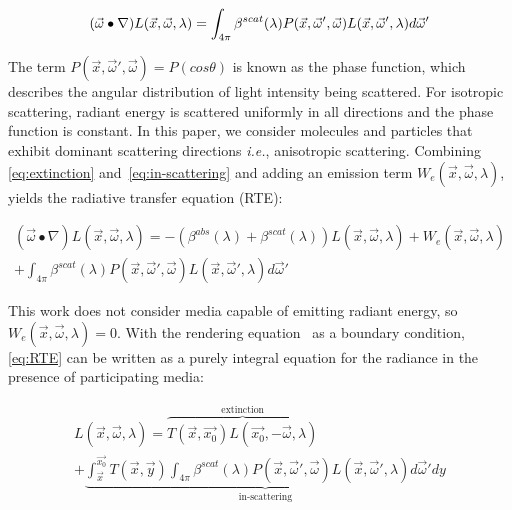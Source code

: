 \documentclass[journal]{vgtc}                %
\begin{document}
\begin{equation}\label{eq:in-scattering}
\small
(\vec{\omega}\bullet \nabla)L(\vec{x},\vec{\omega}, \lambda) = \int_{4\pi}{ \beta^{scat}(\lambda)P(\vec{x}, \vec{\omega}', \vec{\omega})L(\vec{x},\vec{\omega}', \lambda)d\vec{\omega}'}
\end{equation}

The term $P(\vec{x}, \vec{\omega}', \vec{\omega}) = P(cos\theta)$ is known as the phase function, which describes the angular distribution of light intensity being scattered. For isotropic scattering, radiant energy is scattered uniformly in all directions and the phase function is constant. In this paper, we consider molecules and particles that exhibit dominant scattering directions \textit{i.e.}, anisotropic scattering. Combining \autoref{eq:extinction} and~\autoref{eq:in-scattering} and adding an emission term $W_{e}(\vec{x},\vec{\omega}, \lambda)$, yields the radiative transfer equation (RTE):

\vspace*{-4.5mm}
{
  \small
\begin{multline}\label{eq:RTE}
(\vec{\omega}\bullet \nabla)L(\vec{x},\vec{\omega}, \lambda) = - (\beta^{abs}(\lambda) + \beta^{scat}(\lambda))L(\vec{x},\vec{\omega}, \lambda) + W_{e}(\vec{x},\vec{\omega}, \lambda)\\
 + \int_{4\pi}{ \beta^{scat}(\lambda)P(\vec{x}, \vec{\omega}', \vec{\omega})L(\vec{x},\vec{\omega}', \lambda)d\vec{\omega}'}
\end{multline}
}
\vspace*{-4mm}

This work does not consider media capable of emitting radiant energy, so $W_{e}(\vec{x},\vec{\omega}, \lambda) = 0$. With the rendering equation~\cite{Kajiya:1986} as a boundary condition, \autoref{eq:RTE} can be written as a purely integral equation for the radiance in the presence of participating media:

\vspace*{-6mm}
{
  \small
  \begin{multline}\label{eq:VRE}
    L(\vec{x},\vec{\omega}, \lambda) = \overbrace{T(\vec{x}, \vec{x_0})L(\vec{x_0},-\vec{\omega}, \lambda)}^{\text{extinction}}\\
    + \underbrace{\int_{\vec{x}}^{\vec{x_0}}{T(\vec{x}, \vec{y})\int_{4\pi}{ \beta^{scat}(\lambda)P(\vec{x}, \vec{\omega}', \vec{\omega})L(\vec{x},\vec{\omega}', \lambda)d\vec{\omega}'}dy}}_{\text{in-scattering}}
  \end{multline}
}
\vspace*{-2.5mm}
\end{document}

